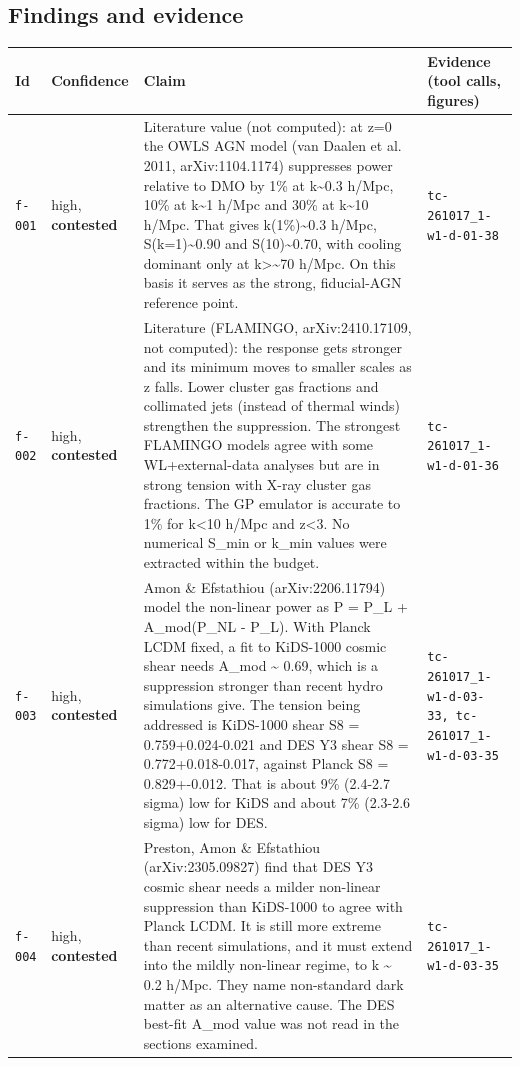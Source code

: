 \documentclass[11pt,a4paper]{article}
\begin{document}
\subsection{Findings and evidence}
\begin{longtable}{@{}p{}p{}p{}p{}@{}}
\toprule Id & Confidence & Claim & Evidence (tool calls, figures) \\ \midrule \endhead
\texttt{f-001} & high, \textbf{contested} & Literature value (not computed): at z=0 the OWLS AGN model (van Daalen et al. 2011, arXiv:1104.1174) suppresses power relative to DMO by 1\% at k\textasciitilde{}0.3 h/Mpc, 10\% at k\textasciitilde{}1 h/Mpc and 30\% at k\textasciitilde{}10 h/Mpc. That gives k(1\%)\textasciitilde{}0.3 h/Mpc, S(k=1)\textasciitilde{}0.90 and S(10)\textasciitilde{}0.70, with cooling dominant only at k\textgreater{}\textasciitilde{}70 h/Mpc. On this basis it serves as the strong, fiducial-AGN reference point. & \texttt{tc-261017\_\allowbreak{}1-w1-d-01-38} \\
\texttt{f-002} & high, \textbf{contested} & Literature (FLAMINGO, arXiv:2410.17109, not computed): the response gets stronger and its minimum moves to smaller scales as z falls. Lower cluster gas fractions and collimated jets (instead of thermal winds) strengthen the suppression. The strongest FLAMINGO models agree with some WL+external-data analyses but are in strong tension with X-ray cluster gas fractions. The GP emulator is accurate to 1\% for k\textless{}10 h/Mpc and z\textless{}3. No numerical S\_min or k\_min values were extracted within the budget. & \texttt{tc-261017\_\allowbreak{}1-w1-d-01-36} \\
\texttt{f-003} & high, \textbf{contested} & Amon \& Efstathiou (arXiv:2206.11794) model the non-linear power as P = P\_L + A\_mod(P\_NL - P\_L). With Planck LCDM fixed, a fit to KiDS-1000 cosmic shear needs A\_mod \textasciitilde{} 0.69, which is a suppression stronger than recent hydro simulations give. The tension being addressed is KiDS-1000 shear S8 = 0.759+0.024-0.021 and DES Y3 shear S8 = 0.772+0.018-0.017, against Planck S8 = 0.829+-0.012. That is about 9\% (2.4-2.7 sigma) low for KiDS and about 7\% (2.3-2.6 sigma) low for DES. & \texttt{tc-261017\_\allowbreak{}1-w1-d-03-33,\allowbreak{} tc-261017\_\allowbreak{}1-w1-d-03-35} \\
\texttt{f-004} & high, \textbf{contested} & Preston, Amon \& Efstathiou (arXiv:2305.09827) find that DES Y3 cosmic shear needs a milder non-linear suppression than KiDS-1000 to agree with Planck LCDM. It is still more extreme than recent simulations, and it must extend into the mildly non-linear regime, to k \textasciitilde{} 0.2 h/Mpc. They name non-standard dark matter as an alternative cause. The DES best-fit A\_mod value was not read in the sections examined. & \texttt{tc-261017\_\allowbreak{}1-w1-d-03-35} \\

\end{longtable}
\end{document}
